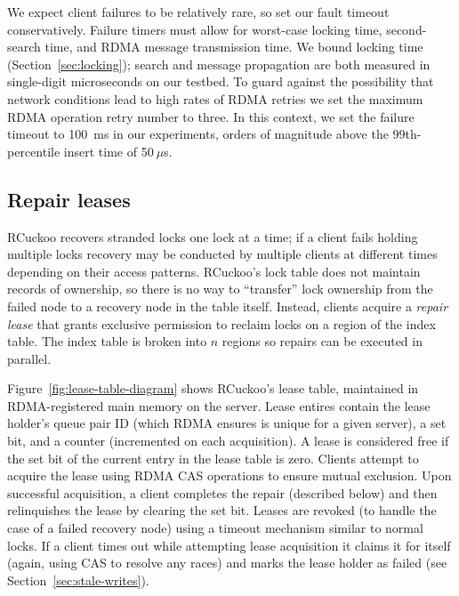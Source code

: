 We expect client failures to be relatively rare, so set
our fault timeout conservatively. Failure timers must allow for
worst-case locking time, second-search time, and RDMA message
transmission time. We bound locking time (Section~\ref{sec:locking});
search and message propagation are both measured in single-digit
microseconds on our testbed.  To guard against the possibility that
network conditions lead to high rates of RDMA retries we set
the maximum RDMA operation retry number to three.  In
this context, we set the failure timeout to 100~ms in our experiments,
orders of magnitude above the 99th-percentile insert time
of 50$~\mu$s.


\subsection{Repair leases}


RCuckoo recovers stranded locks one lock at a time; if a client fails
holding multiple locks recovery may be conducted by multiple clients
at different times depending on their access patterns.  RCuckoo's lock
table does not maintain records of ownership, so there is no way to
``transfer'' lock ownership from the failed node to a recovery node in
the table itself.  Instead, clients acquire a \emph{repair lease} that
grants exclusive permission to reclaim locks on a region of the index
table. The index table is broken into $n$ regions so repairs can be
executed in parallel.

Figure~\ref{fig:lease-table-diagram} shows
RCuckoo's lease table, maintained in RDMA-registered main memory on
the server.  Lease entires contain the lease holder's queue pair ID
(which RDMA ensures is unique for a given server), a set bit, and a
counter (incremented on each acquisition).  A lease is considered free
if the set bit of the current entry in the lease table is zero.
Clients attempt to acquire the lease using RDMA CAS operations to
ensure mutual exclusion.
Upon successful acquisition, a client completes the repair (described
below) and then relinquishes the lease by clearing the set bit.
Leases are revoked (to handle the case of a failed recovery node)
using a timeout mechanism similar to normal locks.  If a client times
out while attempting lease acquisition it claims it for itself (again,
using CAS to resolve any races) and marks the lease holder as failed
(see Section~\ref{sec:stale-writes}).


